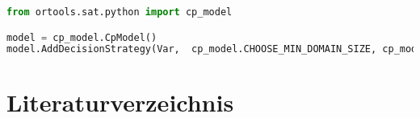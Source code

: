 \documentclass[12pt,a4paper]{article}
\begin{document}
\begin{lstlisting}[language=Python,
  caption={First-Fail-Nachbildung in Python},
  label={lst:ff-in-python}]
from ortools.sat.python import cp_model

model = cp_model.CpModel()
model.AddDecisionStrategy(Var,  cp_model.CHOOSE_MIN_DOMAIN_SIZE, cp_model.SELECT_MIN_VALUE)
\end{lstlisting}


\section{Literaturverzeichnis}
\renewcommand*{\bibname}{} %
\renewcommand*{\refname}{} %
\printbibliography
\end{document}
